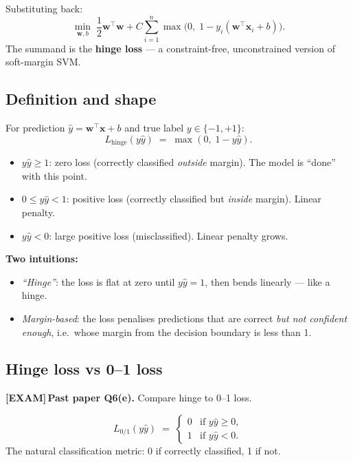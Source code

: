 \documentclass[11pt, a4paper]{article}
\newcommand{\examflag}{\textcolor{tipBd}{\textbf{[EXAM]}}\,}
\begin{document}
Substituting back:
\[
\boxed{\;\min_{\mathbf{w}, b}\;\frac{1}{2}\mathbf{w}^\top\mathbf{w} + C\sum_{i=1}^n \max\big(0,\;1 - y_i(\mathbf{w}^\top\mathbf{x}_i + b)\big).\;}
\]
The summand is the \textbf{hinge loss} — a constraint-free, unconstrained version of soft-margin SVM.

\subsection{Definition and shape}

\begin{defbox}
For prediction $\hat y = \mathbf{w}^\top\mathbf{x} + b$ and true label $y \in \{-1, +1\}$:
\[
L_{\text{hinge}}(y\hat y) \;=\; \max(0,\;1 - y\hat y).
\]
\begin{itemize}
  \item $y\hat y \ge 1$: zero loss (correctly classified \emph{outside} margin). The model is ``done'' with this point.
  \item $0 \le y\hat y < 1$: positive loss (correctly classified but \emph{inside} margin). Linear penalty.
  \item $y\hat y < 0$: large positive loss (misclassified). Linear penalty grows.
\end{itemize}
\end{defbox}

\textbf{Two intuitions:}
\begin{itemize}
  \item \emph{``Hinge''}: the loss is flat at zero until $y\hat y = 1$, then bends linearly — like a hinge.
  \item \emph{Margin-based}: the loss penalises predictions that are correct \emph{but not confident enough}, i.e.\ whose margin from the decision boundary is less than 1.
\end{itemize}

\subsection{Hinge loss vs 0--1 loss}

\examflag{}\textbf{Past paper Q6(e).} Compare hinge to 0--1 loss.

\begin{defbox}[0--1 loss]
\[
L_{0/1}(y\hat y) \;=\; \begin{cases} 0 & \text{if } y\hat y \ge 0, \\ 1 & \text{if } y\hat y < 0. \end{cases}
\]
The natural classification metric: 0 if correctly classified, 1 if not.
\end{defbox}
\end{document}
